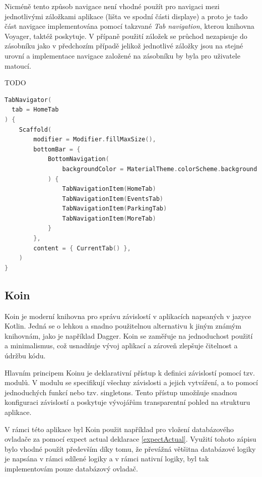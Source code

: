  Nicméně tento způsob navigace není vhodné použít pro navigaci mezi jednotlivými záložkami aplikace (lišta ve spodní části displaye) 
 a proto je tado část navigace 
 implementována pomocí takzvané \textit{Tab navigation}, kterou knihovna Voyager, taktéž poskytuje. V přípaně použití záložek se
 průchod nezapisuje do zásobníku jako v předchozím případě jelikož jednotlivé záložky jsou na stejné urovní a implementace navigace
 založené na zásobníku by byla pro uživatele matoucí.

 TODO
 \begin{lstlisting}[caption={Ukázka použití navigace založené na záložkách}, label={lst:tabNav}, language=Kotlin]
TabNavigator(
  tab = HomeTab
) {
    Scaffold(
        modifier = Modifier.fillMaxSize(),
        bottomBar = {
            BottomNavigation(
                backgroundColor = MaterialTheme.colorScheme.background
            ) {
                TabNavigationItem(HomeTab)
                TabNavigationItem(EventsTab)
                TabNavigationItem(ParkingTab)
                TabNavigationItem(MoreTab)
            }
        },
        content = { CurrentTab() },
    )
}
\end{lstlisting}

\subsection{Koin}
Koin je moderní knihovna pro správu závislostí v aplikacích napsaných v jazyce Kotlin. Jedná se o lehkou a snadno použitelnou alternativu 
k jiným známým knihovnám, jako je například Dagger. Koin se zaměřuje na jednoduchost použití a minimalismus, což usnadňuje vývoj aplikací 
a zároveň zlepšuje čitelnost a údržbu kódu.

Hlavním principem Koinu je deklarativní přístup k definici závislostí pomocí tzv. modulů. V modulu se specifikují všechny závislosti a 
jejich vytváření, a to pomocí jednoduchých funkcí nebo tzv. singletons. Tento přístup umožňuje snadnou konfiguraci závislostí a poskytuje
 vývojářům transparentní pohled na strukturu aplikace.

\bigskip

V rámci této aplikace byl Koin použit například pro vložení databázového ovladače za pomocí expect actual deklarace \ref{expectActual}.
Využití tohoto zápisu bylo vhodné použít především díky tomu, že převážná většitna databázové logiky je napsána v rámci sdílené 
logiky a v rámci nativní logiky, byl tak implementovám pouze databázový ovladač.


